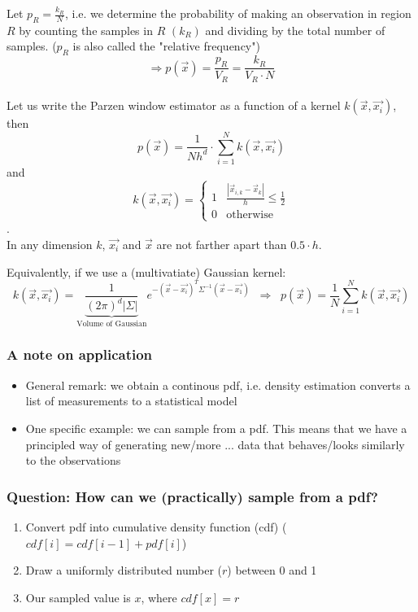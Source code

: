\documentclass{scrartcl}
\begin{document}
Let \(p_R = \frac{k_R}{N}\), i.e. we determine the probability of making an observation in region \(R\) by counting the samples in \(R\) \((k_R)\) and dividing by the total number of samples. (\(p_R\) is also called the "relative frequency")\\
\[\Rightarrow p(\vec{x}) = \frac{p_R}{V_R} = \frac{k_R}{V_R \cdot N}\]\\
Let us write the Parzen window estimator as a function of a kernel \(k(\vec{x},\vec{x_i})\), then
\[p(\vec{x}) = \frac{1}{Nh^d} \cdot \sum\limits_{i=1}^{N} k(\vec{x}, \vec{x_i})\]
and
\[k(\vec{x}, \vec{x_i}) = \begin{cases} 
    1 & \frac{|\vec{x}_{i,k} - \vec{x}_k|}{h} \leq \frac{1}{2} \\ 0 & \text{otherwise}
\end{cases}\].\\
In any dimension \(k\),  \(\vec{x_i}\) and \(\vec{x}\) are not farther apart than \(0.5\cdot h\).

Equivalently, if we use a (multivatiate) Gaussian kernel:
\[ k(\vec{x}, \vec{x_i}) = \underbrace{\frac{1}{(2\pi)^d |\Sigma|}}_{\text{Volume of Gaussian}} e^{-(\vec{x} - \vec{x_i})^T \Sigma^{-1} (\vec{x} - \vec{x_1})} \;\; \Rightarrow \;\; p(\vec{x}) = \frac{1}{N} \sum\limits_{i=1}^{N} k(\vec{x}, \vec{x_i})\]

\subsubsection*{A note on application}
\begin{itemize}
    \item
        General remark: we obtain a continous pdf, i.e. density estimation converts a list of measurements to a statistical model
    \item
        One specific example: we can sample from a pdf. This means that we have a principled way of generating new/more ... data that behaves/looks similarly to the observations
\end{itemize}

\subsubsection*{Question: How can we (practically) sample from a pdf?}
\begin{enumerate}
    \item
        Convert pdf into cumulative density function (cdf) (\( cdf[i] = cdf[i-1] + pdf[i]\))
    \item
        Draw a uniformly distributed number (\(r\)) between 0 and 1
    \item
        Our sampled value is \(x\), where \(cdf[x] = r\)  
\end{enumerate}
\end{document}
